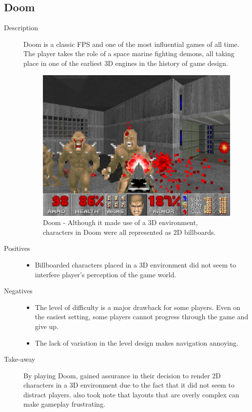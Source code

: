 \subsection{Doom}
\begin{description}
\item[Description]{Doom is a classic FPS and one of the most influential games of all time. The player takes the role of a space marine fighting demons, all taking place in one of the earliest 3D engines in the history of game design.

\begin{figure}[htb]
	\centering\includegraphics[width=.25\linewidth]{images/game_doom}
	\caption{Doom - Although it made use of a 3D environment, characters in Doom were all represented as 2D billboards.}
	\label{fig:doom}
\end{figure}}
\item[Positives]{
\begin{itemize}
\item{Billboarded characters placed in a 3D environment did not seem to interfere player's perception of the game world.}
\end{itemize}
}
\item[Negatives]{
\begin{itemize}
\item{The level of difficulty is a major drawback for some players. Even on the easiest setting, some players cannot progress through the game and give up.}
\item{The lack of variation in the level design makes navigation annoying.}
\end{itemize}
}
\item[Take-away]{By playing Doom, \ourteam{} gained assurance in their decision to render 2D characters in a 3D environment due to the fact that it did not seem to distract players. \ourteam{} also took note that layouts that are overly complex can make gameplay frustrating.}
\end{description}



\clearpage
